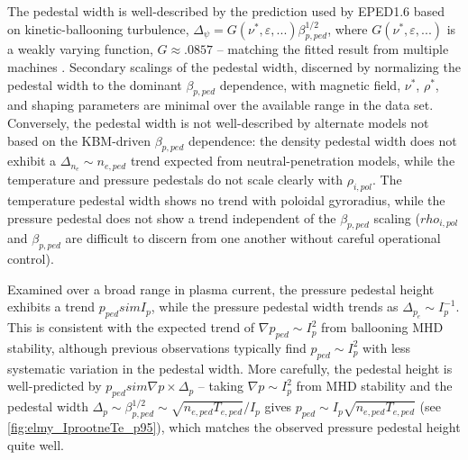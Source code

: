 The pedestal width is well-described by the prediction used by EPED1.6 based on kinetic-ballooning turbulence, $\Delta_\psi = G(\nu^*,\varepsilon,...) \beta_{p,ped}^{1/2}$, where $G(\nu^*,\varepsilon,...)$ is a weakly varying function, $G \approx .0857$ -- matching the fitted result from multiple machines \cite{Groebner2013}.  Secondary scalings of the pedestal width, discerned by normalizing the pedestal width to the dominant $\beta_{p,ped}$ dependence, with magnetic field, $\nu^*$, $\rho^*$, and shaping parameters are minimal over the available range in the data set.  Conversely, the pedestal width is not well-described by alternate models not based on the KBM-driven $\beta_{p,ped}$ dependence: the density pedestal width does not exhibit a $\Delta_{n_e} \sim n_{e,ped}$ trend expected from neutral-penetration models, while the temperature and pressure pedestals do not scale clearly with $\rho_{i,pol}$.  The temperature pedestal width shows no trend with poloidal gyroradius, while the pressure pedestal does not show a trend independent of the $\beta_{p,ped}$ scaling ($rho_{i,pol}$ and $\beta_{p,ped}$ are difficult to discern from one another without careful operational control).

Examined over a broad range in plasma current, the pressure pedestal height exhibits a trend $p_{ped} sim I_p$, while the pressure pedestal width trends as $\Delta_{p_e} \sim I_p^{-1}$.  This is consistent with the expected trend of $\nabla p_{ped} \sim I_p^2$ from ballooning MHD stability, although previous observations typically find $p_{ped} \sim I_p^2$ with less systematic variation in the pedestal width.  More carefully, the pedestal height is well-predicted by $p_{ped} sim \nabla p \times \Delta_{p}$ -- taking $\nabla p \sim I_p^2$ from MHD stability and the pedestal width $\Delta_{p} \sim \beta_{p,ped}^{1/2} \sim \sqrt{n_{e,ped} T_{e,ped}}/I_p$ gives $p_{ped} \sim I_p \sqrt{n_{e,ped} T_{e,ped}}$ (see \cref{fig:elmy_IprootneTe_p95}), which matches the observed pressure pedestal height quite well.\nicechapterending


